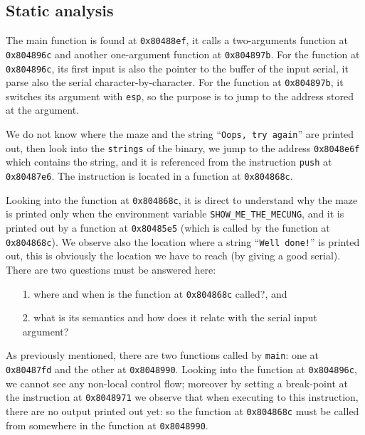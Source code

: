 \documentclass{easychair}
\begin{document}
\subsection{Static analysis}
\label{sec:static_analysis_quick}

The main function is found at \texttt{0x80488ef}, it calls a two-arguments function at \texttt{0x804896c} and another one-argument function at \texttt{0x804897b}. For the function at \texttt{0x804896c}, its first input is also the pointer to the buffer of the input serial, it parse also the serial character-by-character. For the function at \texttt{0x804897b}, it switches its argument with \texttt{esp}, so the purpose is to jump to the address stored at the argument.

We do not know where the maze and the string ``\texttt{Oops, try again}'' are printed out, then look into the \texttt{strings} of the binary, we jump to the address \texttt{0x8048e6f} which contains the string, and it is referenced from the instruction \texttt{push} at \texttt{0x80487e6}. The instruction is located in a function at \texttt{0x804868c}.

Looking into the function at \texttt{0x804868c}, it is direct to understand why the maze is printed only when the environment variable \texttt{SHOW\_ME\_THE\_MECUNG}, and it is printed out by a function at \texttt{0x80485e5} (which is called by the function at \texttt{0x804868c}). We observe also the location where a string ``\texttt{Well done!}'' is printed out, this is obviously the location we have to reach (by giving a good serial). There are two questions must be answered here:
\begin{itemize}
\item[1.] where and when is the function at \texttt{0x804868c} called?, and
\item[2.] what is its semantics and how does it relate with the serial input argument?
\end{itemize}


As previously mentioned, there are two functions called by \texttt{main}: one at \texttt{0x80487fd} and the other at \texttt{0x8048990}. Looking into the function at \texttt{0x804896c}, we cannot see any non-local control flow; moreover by setting a break-point at the instruction at \texttt{0x8048971} we observe that when executing to this instruction, there are no output printed out yet: so the function at \texttt{0x804868c} must be called from somewhere in the function at \texttt{0x8048990}.
\end{document}

